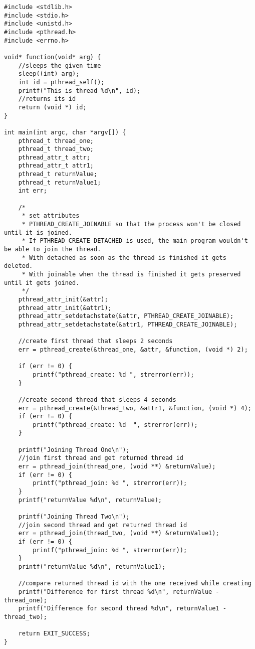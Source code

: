 \documentclass[12pt,a4paper,bibliography=totocnumbered]{scrartcl}
\begin{document}
\begin{lstlisting}[style=CStyle]
#include <stdlib.h>
#include <stdio.h>
#include <unistd.h>
#include <pthread.h>
#include <errno.h>

void* function(void* arg) {
	//sleeps the given time
	sleep((int) arg);
	int id = pthread_self();
	printf("This is thread %d\n", id);
	//returns its id
	return (void *) id;
}

int main(int argc, char *argv[]) {
	pthread_t thread_one;
	pthread_t thread_two;
	pthread_attr_t attr;
	pthread_attr_t attr1;
	pthread_t returnValue;
	pthread_t returnValue1;
	int err;

	/*
	 * set attributes
	 * PTHREAD_CREATE_JOINABLE so that the process won't be closed until it is joined.
	 * If PTHREAD_CREATE_DETACHED is used, the main program wouldn't be able to join the thread.
	 * With detached as soon as the thread is finished it gets deleted.
	 * With joinable when the thread is finished it gets preserved until it gets joined.
	 */
	pthread_attr_init(&attr);
	pthread_attr_init(&attr1);
	pthread_attr_setdetachstate(&attr, PTHREAD_CREATE_JOINABLE);
	pthread_attr_setdetachstate(&attr1, PTHREAD_CREATE_JOINABLE);

	//create first thread that sleeps 2 seconds
	err = pthread_create(&thread_one, &attr, &function, (void *) 2);

	if (err != 0) {
		printf("pthread_create: %d ", strerror(err));
	}

	//create second thread that sleeps 4 seconds
	err = pthread_create(&thread_two, &attr1, &function, (void *) 4);
	if (err != 0) {
		printf("pthread_create: %d  ", strerror(err));
	}

	printf("Joining Thread One\n");
	//join first thread and get returned thread id
	err = pthread_join(thread_one, (void **) &returnValue);
	if (err != 0) {
		printf("pthread_join: %d ", strerror(err));
	}
	printf("returnValue %d\n", returnValue);

	printf("Joining Thread Two\n");
	//join second thread and get returned thread id
	err = pthread_join(thread_two, (void **) &returnValue1);
	if (err != 0) {
		printf("pthread_join: %d ", strerror(err));
	}
	printf("returnValue %d\n", returnValue1);

	//compare returned thread id with the one received while creating
	printf("Difference for first thread %d\n", returnValue - thread_one);
	printf("Difference for second thread %d\n", returnValue1 - thread_two);

	return EXIT_SUCCESS;
}


\end{lstlisting}

\end{document}
